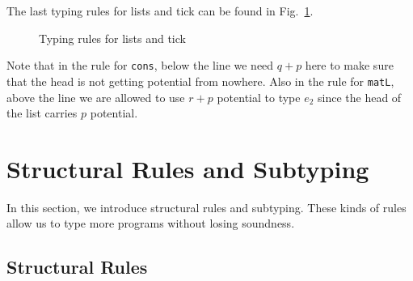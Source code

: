 \documentclass[ manuscript,screen, nonacm]{acmart}
\begin{document}
The last typing rules for lists and tick can be found in Fig.~\ref{fig:ty-lists-tick}.
\begin{figure}
    \centering
    \caption{Typing rules for lists and tick}
    \label{fig:ty-lists-tick}
\end{figure}
Note that in the rule for \texttt{cons}, below the line we need $q+p$ here to make sure that the head is not getting potential from nowhere. Also in the rule for \texttt{matL}, above the line we are allowed to use $r+p$ potential to type $e_2$ since the head of the list carries $p$ potential.




\section{Structural Rules and Subtyping}
In this section, we introduce structural rules and subtyping. These kinds of rules
allow us to type more programs without losing soundness.
\subsection{Structural Rules}
\end{document}
